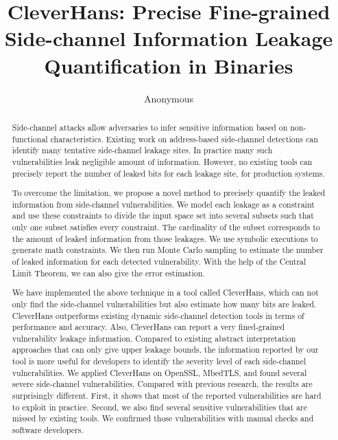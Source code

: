\documentclass[conference]{IEEEtran}
\newcommand{\tool}{TANA}
\renewcommand{\tool}{CleverHans}
\begin{document}
\title{\tool{}: Precise Fine-grained Side-channel Information Leakage Quantification in Binaries}
\author{Anonymous}

\maketitle

\begin{abstract}
Side-channel attacks allow adversaries to infer sensitive information
based on non-functional characteristics.  Existing work on
address-based side-channel detections can identify many tentative
side-channel leakage sites.
In practice many such vulnerabilities leak negligible amount of information. 
However, no existing tools can precisely report the number of leaked
bits for each leakage site, for production systems.

To overcome the limitation, we propose a novel method to precisely
quantify the leaked information from side-channel vulnerabilities.  We
model each leakage as a constraint and use these constraints to
divide the input space set into several subsets such that  %
only one subset satisfies every constraint.  %
The cardinality of the subset corresponds to the amount of leaked
information from those leakages.
We use symbolic executions to
generate math constraints. %
We then run Monte Carlo sampling to estimate the number of
leaked information for each detected vulnerability. With the help of
the Central Limit Theorem, we can also give the error
estimation.

We have implemented the above technique in a tool called \tool{},
which can not only find the side-channel vulnerabilities but also
estimate how many bits are leaked.  \tool{} outperforms existing
dynamic side-channel detection tools in terms of performance and
accuracy. Also, \tool{} can report a very fined-grained vulnerability
leakage information.  Compared to existing abstract interpretation
approaches that can only give upper leakage bounds, the information
reported by our tool is more useful for developers to identify the
severity level of each side-channel vulnerabilities.  We applied
\tool{} on OpenSSL, MbedTLS, and found several severe side-channel
vulnerabilities. Compared with previous research, the results are
surprisingly different.  First, it shows that most of the reported
vulnerabilities are hard to exploit in practice.  Second, we also find
several sensitive vulnerabilities that are missed by existing tools.
We confirmed those vulnerabilities with manual checks and software
developers.

\end{abstract}
\end{document}
